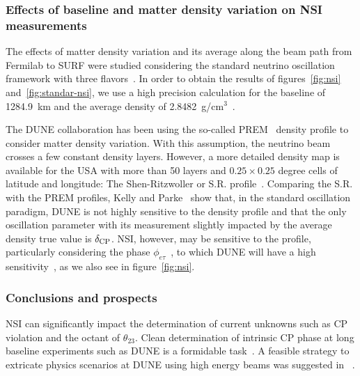 \subsubsection{Effects of baseline and matter density variation on NSI measurements}\label{ssec:matter}
The effects of matter density variation and its average along the beam path from Fermilab to SURF were studied considering the standard neutrino oscillation framework with three flavors~\cite{Roe:2017zdw,Kelly:2018kmb}. In order to obtain the results of figures~\ref{fig:nsi} and~\ref{fig:standar-nsi}, we use a high precision calculation for the baseline of 1284.9~km and the average density of 2.8482~g/cm$^3$~\cite{Roe:2017zdw}.

The DUNE collaboration has been using the so-called PREM~\cite{Dziewonski:1981xy,PREM2} density profile to consider matter density variation. With this assumption, the neutrino beam crosses a few constant density layers.
However, a more detailed density map is available for the USA with more than 50 layers and $0.25 \times 0.25$ degree cells of latitude and longitude: The Shen-Ritzwoller or S.R. profile~\cite{SR:2016,Roe:2017zdw}. Comparing the S.R. with the PREM profiles, Kelly and Parke~\cite{Kelly:2018kmb} show that, in the standard oscillation paradigm, DUNE is not highly sensitive to the density profile and that the only oscillation parameter with its measurement slightly impacted by the average density true value is $\delta_{\rm CP}$.
NSI, however, may be sensitive to the profile, particularly considering the phase $\phi_{e\tau}$~\cite{Chatterjee:2018dyd}, to which DUNE will have a high sensitivity~\cite{Ohlsson:2012kf,Miranda:2015dra,deGouvea:2015ndi,Coloma:2015kiu,Farzan:2017xzy}, as we also see in figure~\ref{fig:nsi}.

\subsubsection{Conclusions and prospects}
NSI can significantly impact the determination of current unknowns such as CP violation and the octant of $\theta_{23}$. Clean determination of intrinsic CP phase at long baseline experiments such as DUNE is a formidable task~\cite{Rout:2017udo}. A feasible strategy to extricate physics scenarios at DUNE using high energy beams was suggested in ~\cite{Masud:2017bcf}.

